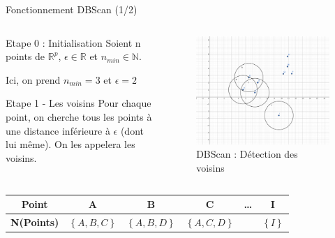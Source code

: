 \begin{frame}{Fonctionnement DBScan (1/2)}

    \begin{columns}
        \begin{column}{0.40\textwidth}
            \begin{block}{Etape 0 : Initialisation}
                Soient n points de $\mathbb{R}^p$, $\epsilon \in \mathbb{R}$ et $n_{min} \in \mathbb{N}$.

                Ici, on prend $n_{min}=3$ et $\epsilon=2$
            \end{block}

            \begin{block}{Etape 1 - Les voisins}
                Pour chaque point, on cherche tous les points à une distance inférieure à $\epsilon$ (dont lui même). On les appelera les voisins.
            \end{block}
        \end{column}

        \begin{column}{0.60\textwidth}
            \begin{figure}
                \includegraphics[height=0.41\paperheight]{images/Illustration_DBScan_1.png}
                \caption{\label{fig:ill_DBScan_1} DBScan : Détection des voisins}
            \end{figure}
        \end{column}
    \end{columns}

    \begin{table}[!ht]
        \centering
        \begin{tabular}{c|ccccc}
            \textbf{Point} & \textbf{A} & \textbf{B} & \textbf{C} & \textbf{\dots} & \textbf{I} \\ \hline
            \textbf{N(Points)} & $\left\{ A, B, C \right\}$ & $\left\{ A, B, D \right\}$ & $\left\{ A, C, D \right\}$ & & $\left\{ I \right\}$ \\ 
        \end{tabular}
    \end{table}
\end{frame}


